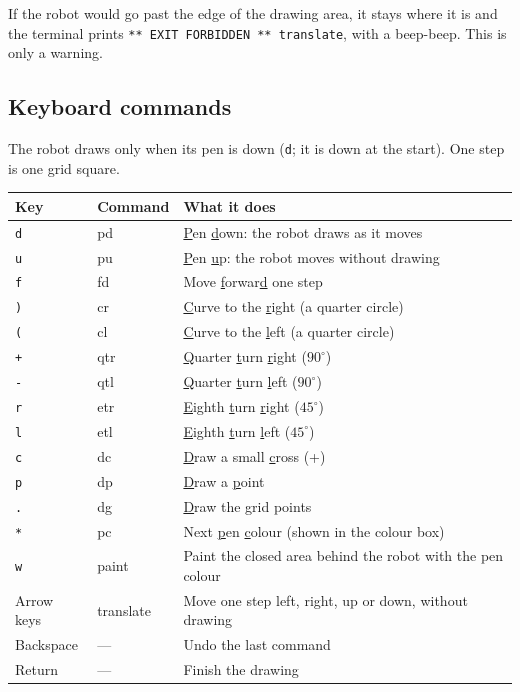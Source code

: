 \documentclass[11pt,a4paper]{article}
\newcommand{\kbd}[1]{\texttt{#1}}
\begin{document}
If the robot would go past the edge of the drawing area, it stays where it
is and the terminal prints \kbd{** EXIT FORBIDDEN ** translate}, with a
beep-beep. This is only a warning.

\subsection{Keyboard commands}
The robot draws only when its pen is down (\kbd{d}; it is down at the
start). One step is one grid square.

\begin{center}
\begin{tabularx}{\linewidth}{@{}l l L@{}}
\toprule
\textbf{Key} & \textbf{Command} & \textbf{What it does} \\
\midrule
\kbd{d} & pd & \underline{P}en \underline{d}own: the robot draws as it moves \\
\kbd{u} & pu & \underline{P}en \underline{u}p: the robot moves without drawing \\
\kbd{f} & fd & Move \underline{f}orwar\underline{d} one step \\
\kbd{)} & cr & \underline{C}urve to the \underline{r}ight (a quarter circle) \\
\kbd{(} & cl & \underline{C}urve to the \underline{l}eft (a quarter circle) \\
\kbd{+} & qtr & \underline{Q}uarter \underline{t}urn \underline{r}ight ($90^\circ$) \\
\kbd{-} & qtl & \underline{Q}uarter \underline{t}urn \underline{l}eft ($90^\circ$) \\
\kbd{r} & etr & \underline{E}ighth \underline{t}urn \underline{r}ight ($45^\circ$) \\
\kbd{l} & etl & \underline{E}ighth \underline{t}urn \underline{l}eft ($45^\circ$) \\
\kbd{c} & dc & \underline{D}raw a small \underline{c}ross (+) \\
\kbd{p} & dp & \underline{D}raw a \underline{p}oint \\
\kbd{.} & dg & \underline{D}raw the \underline{g}rid points \\
\kbd{*} & pc & Next \underline{p}en \underline{c}olour (shown in the colour box) \\
\kbd{w} & paint & Paint the closed area behind the robot with the pen colour \\
Arrow keys & translate & Move one step left, right, up or down, without drawing \\
Backspace & --- & Undo the last command \\
Return & --- & Finish the drawing \\
\bottomrule
\end{tabularx}
\end{center}
\end{document}
